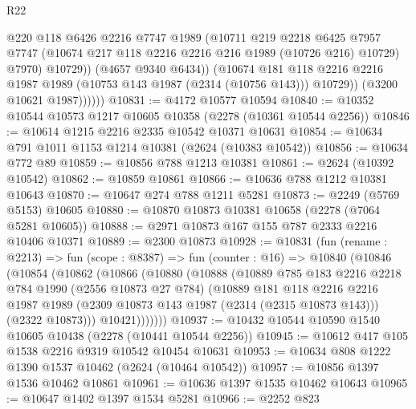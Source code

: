 \begin{lexlean}{R22}
\begin{coremodule}
                      @220
                      @118
                      @6426
                      @2216
                      @7747
                      @1989
                      (@10711
                        @219
                        @2218
                        @6425
                        @7957
                        @7747
                        (@10674 @217 @118 @2216 @2216 @216 @1989 (@10726 @216) @10729)
                        @7970)
                      @10729))
                  (@4657 @9340 @6434))
                (@10674
                  @181
                  @118
                  @2216
                  @2216
                  @1987
                  @1989
                  (@10753 @143 @1987 (@2314 (@10756 @143)))
                  @10729))
              (@3200 @10621 @1987))))))
@10831 := @4172 @10577 @10594
@10840 := @10352 @10544 @10573 @1217 @10605 @10358 (@2278 (@10361 @10544 @2256))
@10846 := @10614 @1215 @2216 @2335 @10542 @10371 @10631
@10854 := @10634 @791 @1011 @1153 @1214 @10381 (@2624 (@10383 @10542))
@10856 := @10634 @772 @89
@10859 := @10856 @788 @1213 @10381
@10861 := @2624 (@10392 @10542)
@10862 := @10859 @10861
@10866 := @10636 @788 @1212 @10381 @10643
@10870 := @10647 @274 @788 @1211 @5281
@10873 := @2249 (@5769 @5153) @10605
@10880 := @10870 @10873 @10381 @10658 (@2278 (@7064 @5281 @10605))
@10888 := @2971 @10873 @167 @155 @787 @2333 @2216 @10406 @10371
@10889 := @2300 @10873
@10928 := @10831
    (fun (rename : @2213) =>
    fun (scope : @8387) =>
    fun (counter : @16) =>
    @10840
      (@10846
        (@10854
          (@10862
            (@10866
              (@10880
                (@10888
                  (@10889
                    @785
                    @183
                    @2216
                    @2218
                    @784
                    @1990
                    (@2556 @10873 @27 @784)
                    (@10889
                      @181
                      @118
                      @2216
                      @2216
                      @1987
                      @1989
                      (@2309 @10873 @143 @1987 (@2314 (@2315 @10873 @143)))
                      (@2322 @10873)))
                  @10421)))))))
@10937 := @10432 @10544 @10590 @1540 @10605 @10438 (@2278 (@10441 @10544 @2256))
@10945 := @10612 @417 @105 @1538 @2216 @9319 @10542 @10454 @10631
@10953 := @10634 @808 @1222 @1390 @1537 @10462 (@2624 (@10464 @10542))
@10957 := @10856 @1397 @1536 @10462 @10861
@10961 := @10636 @1397 @1535 @10462 @10643
@10965 := @10647 @1402 @1397 @1534 @5281
@10966 := @2252 @823

\end{coremodule}
\end{lexlean}
